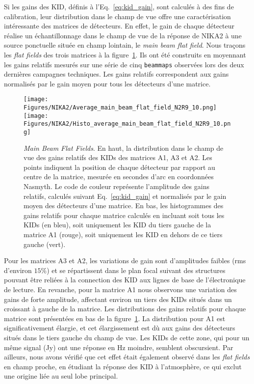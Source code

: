 Si les gains des KID, définis à l'Eq.~\ref{eq:kid_gain}, sont calculés
à des fins de calibration, leur distribution dans le champ de vue offre
une caractérisation intéressante des matrices de détecteurs. En effet,
le gain de chaque détecteur réalise un échantillonnage dans le champ
de vue de la réponse de NIKA2 à une source ponctuelle située en champ lointain, le
\emph{main beam flat field}. Nous traçons les \emph{flat fields} des
trois matrices à la figure~\ref{fig:avg_mbff}. Ils ont été construits
en moyennant les gains relatifs mesurés sur une série de cinq
{\tt beammaps} observées lors des deux dernières campagnes
techniques. Les gains relatifs correspondent aux gains normalisés par
le gain moyen pour tous les détecteurs d'une matrice. 
\begin{figure}[!thbp] 
\begin{center}
  \texttt{[image: Figures/NIKA2/Average\_main\_beam\_flat\_field\_N2R9\_10.png]}
  \texttt{[image: Figures/NIKA2/Histo\_average\_main\_beam\_flat\_field\_N2R9\_10.png]}
  \caption[Average main beam flat fields]{\emph{Main Beam Flat
      Fields}. En haut, la distribution dans le champ de vue des gains
    relatifs des KIDs des matrices A1, A3 et A2. Les points indiquent
    la position de chaque détecteur par rapport au centre de la
    matrice, mesurée en secondes d'arc en coordonnées Nasmyth. Le code
    de couleur représente l'amplitude des gains relatifs, calculés
    suivant Eq.~\ref{eq:kid_gain} et normalisés par le gain moyen des
    détecteurs d'une matrice. En bas, les histogrammes des gains
    relatifs pour chaque matrice calculés en incluant soit tous les KIDs
    (en bleu), soit uniquement les KID du tiers gauche de la matrice
    A1 (rouge), soit uniquement les KID en dehors de ce tiers gauche
    (vert).}
 \label{fig:avg_mbff}
\end{center}
\end{figure}
%
Pour les matrices A3 et A2, les variations de gain sont d'amplitudes
faibles (rms d'environ $15\%$) et se répartissent dans le plan
focal suivant des structures pouvant être reliées à la connection des
KID aux lignes de base de l'électronique de lecture. En revanche, pour
la matrice A1 nous observons une variation des gains de forte
amplitude, affectant environ un tiers des KIDs situés dans un
croissant à gauche de la matrice. Les distributions des gains relatifs
pour chaque matrice sont présentées en bas de la
figure~\ref{fig:avg_mbff}. La distribution pour A1 est
significativement élargie, et cet élargissement est dù aux gains des
détecteurs situés dans le tiers gauche du champ de vue. Les KIDs de
cette zone, qui pour un même signal (Jy) ont une réponse en Hz
moindre, semblent obscursient. Par ailleurs, nous avons vérifié que cet
effet était également observé dans les \emph{flat fields} en champ
proche, en étudiant la réponse des KID à l'atmosphère, ce qui exclut
une origine liée au seul lobe principal.


